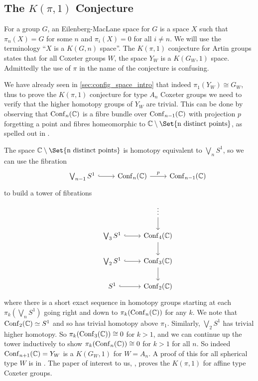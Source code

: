 \documentclass[class=article, crop=false]{standalone}
\begin{document}
	
\subsection{The $K(\pi,1)$ Conjecture}
For a group $G$, an Eilenberg-MacLane space \cite{eilenberg_relations_1945} for $G$ is a space $X$ such that $\pi_n(X)=G$ for some $n$ and $\pi_i(X) = 0$ for all $i\neq n$. We will use the terminology ``$X$ is a $K(G,n)$ space''. The $K(\pi,1)$ conjecture for Artin groups states that for all Coxeter groups $W$, the space $Y_W$ is a $K(G_W,1)$ space. Admittedly the use of $\pi$ in the name of the conjecture is confusing.

We have already seen in \cref{sec:config_space_intro} that indeed $\pi_1(Y_W) \cong G_W$, thus to prove the $K(\pi, 1)$ conjecture for type $A_n$ Coxeter groups we need to verify that the higher homotopy groups of $Y_W$ are trivial. This can be done by observing that $\operatorname{Conf}_n(\mathbb{C})$ is a fibre bundle over $\operatorname{Conf}_{n-1}(\mathbb{C})$ with projection $p$ forgetting a point and fibres homeomorphic to $\C \setminus \Set{\text{n distinct points}}$, as spelled out in \cite{sinha_homology_2010}.

The space $\C \setminus \Set{\text{n distinct points}}$ is homotopy equivalent to $\bigvee_n S^1$, so we can use the fibration
\begin{equation*}
	\begin{tikzcd}
		&\bigvee_{n-1} S^1 \arrow[hook]{r} &\conf_n(\C) \arrow{r}{p} &\conf_{n-1}(\C)
	\end{tikzcd}
\end{equation*}
to build a tower of fibrations
\begin{equation*}
	\begin{tikzcd}
		& 							&\vdots \arrow{d} 	\\
		&\bigvee_3 S^1 	\arrow[hook]{r} 	&\conf_4(\C)  \arrow{d} \\
		&\bigvee_2 S^1 	\arrow[hook]{r} 	&\conf_3(\C)  \arrow{d} \\
		&S^1 	\arrow[hook]{r} 	&\conf_2(\C)
	\end{tikzcd}
\end{equation*}
where there is a short exact sequence in homotopy groups starting at each $\pi_k(\bigvee_n S^1)$ going right and down to $\pi_k(\operatorname{Conf}_n(\mathbb{C}))$ for any $k$. We note that $\operatorname{Conf}_2(\mathbb{C}) \simeq S^1$ and so has trivial homotopy above $\pi_1$. Similarly, $\bigvee_2 S^1$ has trivial higher homotopy. So $\pi_k(\operatorname{Conf}_3(\mathbb{C})) \cong 0$ for $k>1$, and we can continue up the tower inductively to show $\pi_k(\operatorname{Conf}_n(\mathbb{C})) \cong 0$ for $k>1$ for all $n$. So indeed $\operatorname{Conf}_{n+1}(\mathbb{C}) = Y_W$ is a $K(G_W,1)$ for $W=A_n$. A proof of this for all spherical type $W$ is in \cite{deligne_les_1972}. The paper of interest to us, \cite{paolini_salvetti_kpi1_2021}, proves the $K(\pi,1)$ for affine type Coxeter groups. 
\end{document}
